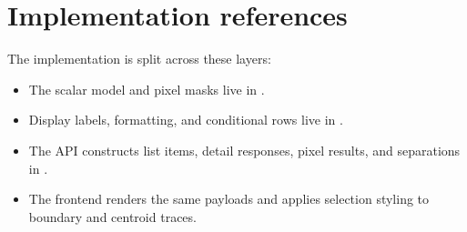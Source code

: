 \documentclass[11pt]{article}
\begin{document}
\section{Implementation references}
The implementation is split across these layers:
\begin{itemize}
  \item The scalar model and pixel masks live in .
  \item Display labels, formatting, and conditional rows live in .
  \item The API constructs list items, detail responses, pixel results, and separations in .
  \item The frontend renders the same payloads and applies selection styling to boundary and centroid traces.
\end{itemize}
\end{document}
